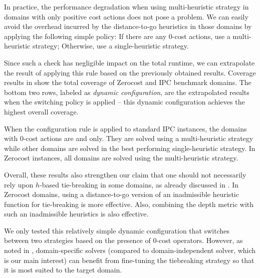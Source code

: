 In practice, the performance degradation when using multi-heuristic strategy in domains with only positive cost actions does not pose a problem.
We can easily avoid the overhead incurred by the distance-to-go heuristics in those domains by applying the following simple policy:
If there are any 0-cost actions, use a multi-heuristic strategy; Otherwise, use a single-heuristic strategy.

Since such a check has negligible impact on the total runtime, we can extrapolate the result of applying this rule based on the previously obtained results.
Coverage results in  show the total coverage of
Zerocost and IPC benchmark domains. The bottom two rows, labeled as \emph{dynamic configuration},
are the extrapolated results when the switching policy is applied -- this dynamic configuration achieves the highest overall coverage.

\begin{table}[htbp]
 \centering 
 \caption{
 Summary Results: Coverage comparison, the total of IPC domains and Zerocost domains (the number of instances
 solved in 5min, 4GB) between several sorting strategies, plus a dynamic configuration strategy.  $[f,h,\fifo],
 [f,h,\ro], [f,\hh,\mit{default}], [f,h, \hh,\mit{default}], [f,\ffo,\mit{default}]$ are not shown because they achieve smaller coverage.
 }
 \label{tbl:dtg-summary-sum}
\end{table}

When the configuration rule is applied to standard IPC instances, the domains with 0-cost actions are  and  only. They are solved using a multi-heuristic strategy while other domains are solved in the best performing single-heuristic strategy. In Zerocost instances, all domains are solved using the multi-heuristic strategy.



Overall, these results also strengthen our claim that one should not necessarily rely upon $h$-based
tie-breaking in some
domains, as already discussed in . In Zerocost domains,
using a distance-to-go version of an inadmissible heuristic function for
tie-breaking is more effective. Also, combining the depth metric with
such an inadmissible heuristics is also effective.

We only tested this relatively simple dynamic configuration that switches between two strategies based on the presence of 0-cost operators. However, as noted in , domain-specific solvers (compared to domain-independent solver, which is our main interest) can benefit from fine-tuning the tiebreaking strategy so that it is most suited to the target domain.

